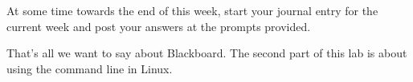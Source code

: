 \begin{firstonly}
At some time towards the end of this week, start your journal entry for the current week and post your answers at the prompts provided.














That's all we want to say about Blackboard. The second part of this lab is about using the command line in Linux.

  
\end{firstonly}

